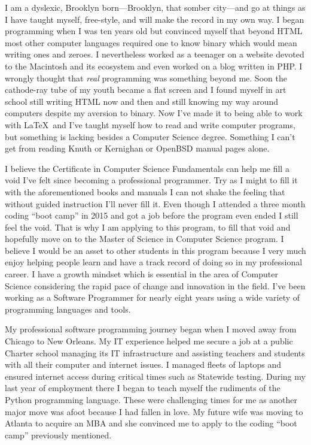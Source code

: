 \documentclass[12pt]{article}
\begin{document}
I am a dyslexic, Brooklyn born---Brooklyn, that somber city---and go at things as I have taught myself, free-style, and will make the record in my own way.
I began programming when I was ten years old but convinced myself that beyond HTML most other computer languages required one to know binary which would mean writing ones and zeroes. I nevertheless worked as a teenager on a website devoted to the Macintosh and its ecosystem and even worked on a blog written in PHP. I wrongly thought that \emph{real} programming was something beyond me. Soon the cathode-ray tube of my youth became a flat screen and I found myself in art school still writing HTML now and then and still knowing my way around computers despite my aversion to binary. Now I've made it to being able to work with \LaTeX\ and I've taught myself how to read and write computer programs, but something is lacking besides a Computer Science degree. Something I can't get from reading Knuth or Kernighan or OpenBSD manual pages alone.

I believe the Certificate in Computer Science Fundamentals can help me fill a void I've felt since becoming a professional programmer. Try as I might to fill it with the aforementioned books and manuals I can not shake the feeling that without guided instruction I'll never fill it. Even though I attended a three month coding ``boot camp'' in 2015 and got a job before the program even ended I still feel the void. That is why I am applying to this program, to fill that void and hopefully move on to the Master of Science in Computer Science program. I believe I would be an asset to other students in this program because I very much enjoy helping people learn and have a track record of doing so in my professional career. I have a growth mindset which is essential in the area of Computer Science considering the rapid pace of change and innovation in the field. I've been working as a Software Programmer for nearly eight years using a wide variety of programming languages and tools.

My professional software programming journey began when I moved away from Chicago to New Orleans. My IT experience helped me secure a job at a public Charter school managing its IT infrastructure and assisting teachers and students with all their computer and internet issues. I managed fleets of laptops and ensured internet access during critical times such as Statewide testing. During my last year of employment there I began to teach myself the rudiments of the Python programming language. These were challenging times for me as another major move was afoot because I had fallen in love. My future wife was moving to Atlanta to acquire an MBA and she convinced me to apply to the coding ``boot camp'' previously mentioned.
\end{document}
